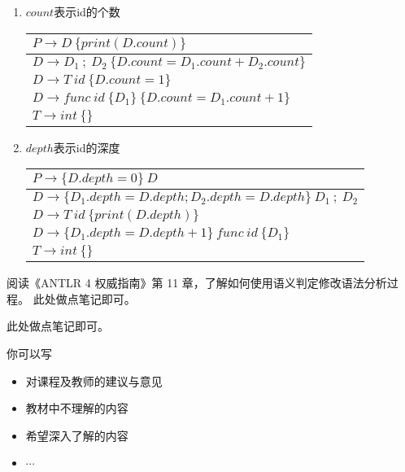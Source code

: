 \documentclass[a4paper, justified]{tufte-handout}
\begin{document}
\begin{solution}
	\begin{enumerate}[(1)]
		\item $count$表示id的个数\\
		\begin{tabular}{|l|}
			\hline
			$P\to D\ \{print(D.count)\}$							\\ \hline
			$D\to D_1\ ;\ D_2\ \{D.count = D_1.count + D_2.count\}$ \\ \hline
			$D\to T\ id\ \{D.count = 1\}$      						\\ \hline
			$D\to func\ id\ \{D_1\}\ \{D.count = D_1.count + 1\}$   \\ \hline
			$T\to int\ \{\}$                                 	    \\ \hline
		\end{tabular}
		\item $depth$表示id的深度\\
		\begin{tabular}{|l|}
			\hline
			$P\to \{D.depth = 0\}\ D$										 \\ \hline
			$D\to \{D_1.depth = D.depth; D_2.depth = D.depth\}\ D_1\ ;\ D_2$ \\ \hline
			$D\to T\ id\ \{print(D.depth)\}$      							 \\ \hline
			$D\to \{D_1.depth = D.depth + 1\}\ func\ id\ \{D_1\}$   		 \\ \hline
			$T\to int\ \{\}$                                 	    		 \\ \hline
		\end{tabular}
	\end{enumerate} 
\end{solution}

\pagebreak
\begin{problem}
  阅读《ANTLR 4 权威指南》第 11 章，了解如何使用语义判定修改语法分析过程。
  此处做点笔记即可。
\end{problem}

\begin{solution}
	此处做点笔记即可。
\end{solution}



\beginfb

你可以写
\begin{itemize}
  \item 对课程及教师的建议与意见
  \item 教材中不理解的内容
  \item 希望深入了解的内容
  \item $\cdots$
\end{itemize}
\end{document}
